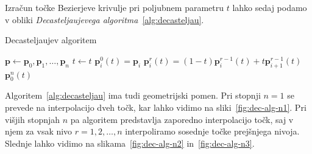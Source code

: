 \documentclass[isrm2, tisk]{fmfdelo}
\newcommand{\p}{\mathbf{p}}
\begin{document}
    Izračun točke Bezierjeve krivulje pri poljubnem parametru $t$ lahko sedaj podamo v obliki \textit{Decasteljaujevega algoritma}~\ref{alg:decasteljau}.
    \begin{algorithm}[H]
        \caption{Decasteljaujev algoritem}
        \label{alg:decasteljau}
        \begin{algorithmic}
            \State $\p \gets \p_0,\p_1,\dots,\p_n$
            \State $t \gets t$
                \State $\p_i^0(t)=\p_i$
            \EndFor
                    \State $\p_i^r(t)=(1-t)\p_i^{r-1}(t)+t\p_{i+1}^{r-1}(t)$
                \EndFor
            \EndFor
            \State \Return $\p_0^n(t)$
        \end{algorithmic}
    \end{algorithm}
    Algoritem~\ref{alg:decasteljau} ima tudi geometrijski pomen.
    Pri stopnji $n=1$ se prevede na interpolacijo dveh točk, kar lahko vidimo na sliki~\ref{fig:dec-alg-n1}.
    Pri višjih stopnjah $n$ pa algoritem predstavlja zaporedno interpolacijo točk, saj v njem za vsak nivo $r=1,2,\ldots,n$ interpoliramo sosednje točke prejšnjega nivoja.
    Slednje lahko vidimo na slikama~\ref{fig:dec-alg-n2} in~\ref{fig:dec-alg-n3}.
\end{document}
